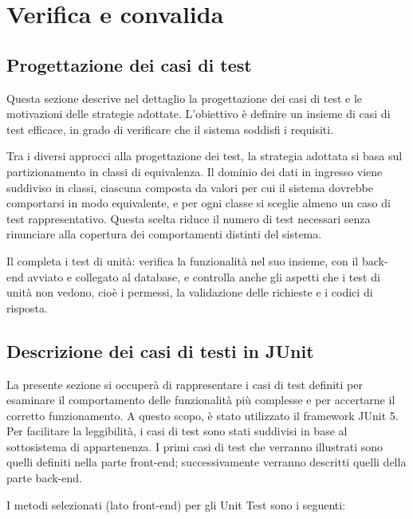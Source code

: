 \chapter{Verifica e convalida} %

\label{Chapter3} %

\section{Progettazione dei casi di test}

Questa sezione descrive nel dettaglio la progettazione dei casi di test e le motivazioni 
delle strategie adottate. L’obiettivo è definire un insieme di casi di test 
efficace, in grado di verificare che il sistema soddisfi i requisiti.

Tra i diversi approcci alla progettazione dei test, la strategia adottata 
si basa sul partizionamento in classi di equivalenza. Il dominio dei dati in 
ingresso viene suddiviso in classi, ciascuna composta da valori per cui il 
sistema dovrebbe comportarsi in modo equivalente, e per ogni classe si sceglie 
almeno un caso di test rappresentativo. Questa scelta riduce il numero di test 
necessari senza rinunciare alla copertura dei comportamenti distinti del sistema.

Il  completa i test di unità: verifica la funzionalità nel 
suo insieme, con il back-
end avviato e collegato al database, e controlla anche gli aspetti che i 
test di unità non
vedono, cioè i permessi, la validazione delle richieste e i codici di risposta.

\section{Descrizione dei casi di testi in JUnit}
La presente sezione si occuperà di rappresentare i casi di test definiti per esaminare il comportamento delle funzionalità più complesse e per accertarne il corretto funzionamento. A questo scopo, è stato utilizzato il framework JUnit 5. \\
\indent Per facilitare la leggibilità, i casi di test sono stati suddivisi in base al sottosistema di appartenenza. I primi casi di test che verranno illustrati sono quelli definiti nella parte front-end; successivamente verranno descritti quelli della parte back-end.

I metodi selezionati (lato front-end) per gli Unit Test sono i seguenti:


